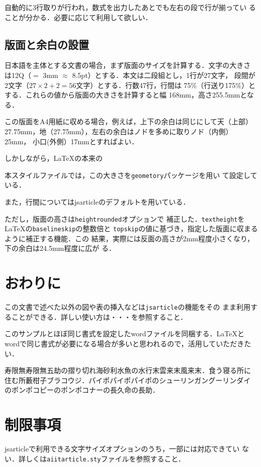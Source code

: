 \documentclass[a4j, 12Q, twocolumn, twoside]{jsarticle}
\newcommand{\cmd}[1]{\texttt{\symbol{"5C}#1}} %
\begin{document}
自動的に3行取りが行われ，数式を出力したあとでも左右の段で行が揃ってい
ることが分かる．必要に応じて利用して欲しい．

\subsection{版面と余白の設置}
日本語を主体とする文書の場合，まず版面のサイズを計算する．文字の大きさ
は12Q（$=$ 3mm $\approx$ 8.5pt）とする．本文は二段組とし，1行が27文字，
段間が2文字（$27 \times 2 + 2 = 56$文字）とする．行数47行，行間は
75\%（行送り175\%）とする．これらの値から版面の大きさを計算すると幅
168mm，高さ255.5mmとなる．

この版面をA4用紙に収める場合，例えば，上下の余白は同じにして天（上部）
27.75mm，地（27.75mm），左右の余白はノドを多めに取りノド（内側）25mm，
小口(外側）17mmとすればよい．

しかしながら，\LaTeX の本来の

本スタイルファイルでは，この大きさを\texttt{geometory}パッケージを用い
て設定している．

また，行間についてはjsarticleのデフォルトを用いている．

ただし，版面の高さは\texttt{heightrounded}オプションで
補正した．\cmd{textheight}を\LaTeX の\cmd{baselineskip}の整数倍と
\cmd{topskip}の値に基づき，指定した版面に収まるように補正する機能．この
結果，実際には反面の高さが2mm程度小さくなり，下の余白は24.5mm程度に広が
る．

\section{おわりに}
この文書で述べた以外の図や表の挿入などは\texttt{jsarticle}の機能をその
まま利用することができる．詳しい使い方は・・・を参照すること．

このサンプルとほぼ同じ書式を設定したwordファイルを同梱する．\LaTeX と
wordで同じ書式が必要になる場合が多いと思われるので，活用していただきた
い．

寿限無寿限無五劫の摺り切れ海砂利水魚の水行末雲来末風来末．食う寝る所に
住む所藪柑子ブラコウジ．パイポパイポパイポのシューリンガングーリンダイ
のポンポコピーのポンポコナーの長久命の長助．

\section{制限事項}
jsarticleで利用できる文字サイズオプションのうち，一部には対応できてい
ない．詳しくは\texttt{aiitarticle.sty}ファイルを参照すること．
\end{document}
